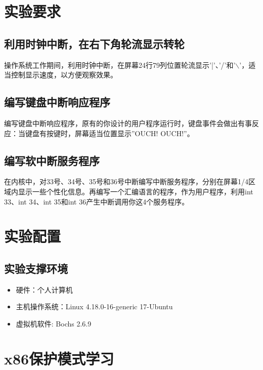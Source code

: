 \documentclass[a4paper,11pt,UTF8]{ctexart}
\begin{document}
\section{实验要求}

	\subsection{利用时钟中断，在右下角轮流显示转轮}

	操作系统工作期间，利用时钟中断，在屏幕24行79列位置轮流显示’|’、’/’和'$\backslash$'，适当控制显示速度，以方便观察效果。

	\subsection{编写键盘中断响应程序}
	编写键盘中断响应程序，原有的你设计的用户程序运行时，键盘事件会做出有事反应：当键盘有按键时，屏幕适当位置显示”OUCH! OUCH!”。
	\subsection{编写软中断服务程序}
	在内核中，对33号、34号、35号和36号中断编写中断服务程序，分别在屏幕1/4区域内显示一些个性化信息。再编写一个汇编语言的程序，作为用户程序，利用int 33、int 34、int 35和int 36产生中断调用你这4个服务程序。

\section{实验配置}

	\subsection{实验支撑环境}
		\begin{itemize} 
			\item 硬件：个人计算机
			\item 主机操作系统：Linux 4.18.0-16-generic 17-Ubuntu
			\item 虚拟机软件: Bochs 2.6.9
		\end{itemize}
	
	
	 
\section{x86保护模式学习}
\end{document}
